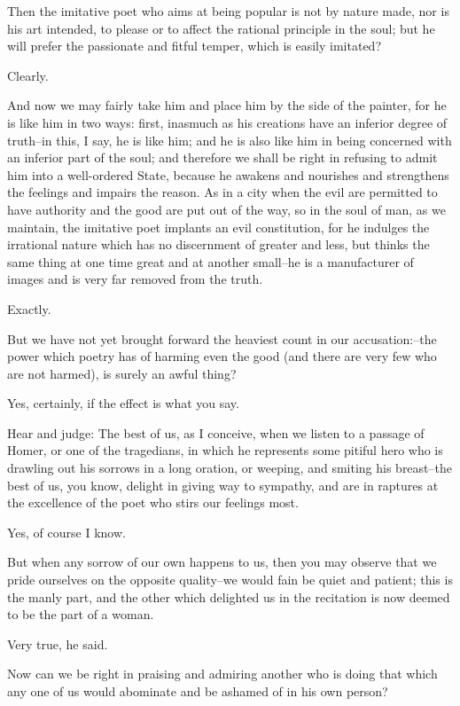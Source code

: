Then the imitative poet who aims at being popular is not by nature made,
nor is his art intended, to please or to affect the rational principle
in the soul; but he will prefer the passionate and fitful temper, which
is easily imitated?

Clearly.

And now we may fairly take him and place him by the side of the painter,
for he is like him in two ways: first, inasmuch as his creations have an
inferior degree of truth--in this, I say, he is like him; and he is
also like him in being concerned with an inferior part of the soul; and
therefore we shall be right in refusing to admit him into a well-ordered
State, because he awakens and nourishes and strengthens the feelings
and impairs the reason. As in a city when the evil are permitted to have
authority and the good are put out of the way, so in the soul of man,
as we maintain, the imitative poet implants an evil constitution, for he
indulges the irrational nature which has no discernment of greater
and less, but thinks the same thing at one time great and at another
small--he is a manufacturer of images and is very far removed from the
truth.

Exactly.

But we have not yet brought forward the heaviest count in our
accusation:--the power which poetry has of harming even the good (and
there are very few who are not harmed), is surely an awful thing?

Yes, certainly, if the effect is what you say.

Hear and judge: The best of us, as I conceive, when we listen to a
passage of Homer, or one of the tragedians, in which he represents
some pitiful hero who is drawling out his sorrows in a long oration, or
weeping, and smiting his breast--the best of us, you know, delight in
giving way to sympathy, and are in raptures at the excellence of the
poet who stirs our feelings most.

Yes, of course I know.

But when any sorrow of our own happens to us, then you may observe that
we pride ourselves on the opposite quality--we would fain be quiet and
patient; this is the manly part, and the other which delighted us in the
recitation is now deemed to be the part of a woman.

Very true, he said.

Now can we be right in praising and admiring another who is doing that
which any one of us would abominate and be ashamed of in his own person?

